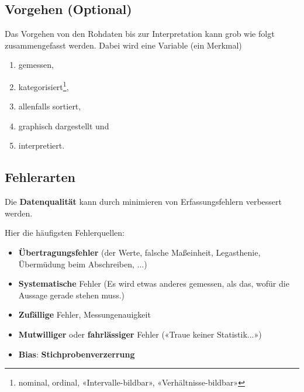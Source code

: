 
\subsection{Vorgehen (Optional)}
Das Vorgehen von den Rohdaten bis zur Interpretation kann grob wie folgt zusammengefasst werden. Dabei wird eine Variable (ein Merkmal)
\begin{enumerate}
\item gemessen,
\item kategorisiert\footnote{nominal, ordinal, «Intervalle-bildbar»,
    «Verhältnisse-bildbar»},
\item allenfalls sortiert,
\item graphisch dargestellt und
\item interpretiert.
\end{enumerate}
\newpage


\subsection{Fehlerarten}


Die \textbf{Datenqualität} kann durch minimieren
von Erfassungsfehlern verbessert werden.

Hier die häufigsten Fehlerquellen:


\begin{itemize}
  
\item \textbf{Übertragungsfehler} (der Werte, \zB falsche Maßeinheit,
  Legasthenie, Übermüdung beim Abschreiben, ...)

\item \textbf{Systematische} Fehler (Es wird etwas anderes gemessen, als das,
  wofür die Aussage gerade stehen muss.)

\item \textbf{Zufällige} Fehler, Messungenauigkeit

\item \textbf{Mutwilliger} oder \textbf{fahrlässiger} Fehler («Traue keiner Statistik...»)

\item \textbf{Bias}: \textbf{Stichprobenverzerrung}
\end{itemize}

\newpage

